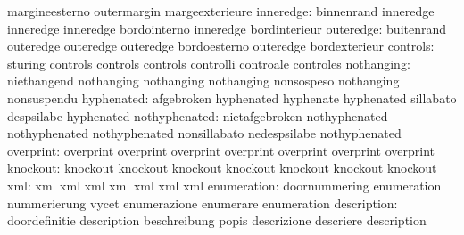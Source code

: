                            margineesterno            outermargin
                           margeexterieure
                inneredge: binnenrand                inneredge
                           inneredge                 inneredge
                           bordointerno              inneredge
                           bordinterieur
                outeredge: buitenrand                outeredge
                           outeredge                 outeredge
                           bordoesterno              outeredge
                           bordexterieur
                 controls: sturing                   controls
                           controls                  controls
                           controlli                 controale
                           controles
               nothanging: niethangend               nothanging
                           nothanging                nothanging
                           nonsospeso                nothanging
                           nonsuspendu
               hyphenated: afgebroken                hyphenated
                           hyphenate                 hyphenated
                           sillabato                 despsilabe
                           hyphenated
            nothyphenated: nietafgebroken            nothyphenated
                           nothyphenated             nothyphenated
                           nonsillabato              nedespsilabe
                           nothyphenated
                overprint: overprint                 overprint
                           overprint                 overprint
                           overprint                 overprint
                           overprint
                 knockout: knockout                  knockout
                           knockout                  knockout
                           knockout                  knockout
                           knockout
                      xml: xml                       xml
                           xml                       xml
                           xml                       xml
                           xml
              enumeration: doornummering             enumeration
                           nummerierung              vycet
                           enumerazione              enumerare
                           enumeration
              description: doordefinitie             description
                           beschreibung              popis
                           descrizione               descriere
                           description

